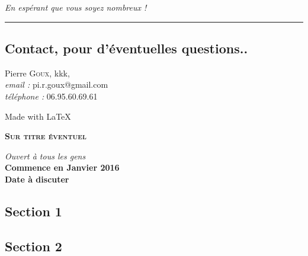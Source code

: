 \documentclass[10pt,a4paper,twocolumn,landscape]{article}
\begin{document}
\begin{CJK}{UTF8}{min}
\textit{En espérant que vous soyez nombreux !}


\rule{7cm}{0.5pt}
\subsection*{Contact, pour d'éventuelles questions..} 
Pierre \textsc{Goux}, kkk, \\
{\em email :} pi.r.goux@gmail.com \\ 
{\em téléphone :} 06.95.60.69.61
\begin{flushright}
\small{Made with \LaTeX}
\end{flushright}
\newpage

\begin{center}
{\bf 
{\huge{\textsc{Sur titre éventuel}
}}}

\vspace*{5em}

\normalsize{}
\def\arete{3}   \def\epaisseur{5}   \def\rayon{2}
\newcommand{\ruban}{(0,0)
++(0:0.57735*\arete-0.57735*\epaisseur+2*\rayon)
++(-30:\epaisseur-1.73205*\rayon)
arc (60:0:\rayon)   -- ++(90:\epaisseur)
arc (0:60:\rayon)   -- ++(150:\arete)
arc (60:120:\rayon) -- ++(210:\epaisseur)
arc (120:60:\rayon) -- cycle}


\end{center}

\begin{center}
\textit{Ouvert à tous les gens}\\
{\bf 
\Large{Commence en Janvier 2016\\\vspace{3pt} Date à discuter\\\vspace{10pt}}
}
\end{center}


\newpage

\begin{framed}
\section{Section 1}
\end{framed}
\newpage
\begin{framed}
\section{Section 2}

\end{framed}
\end{CJK}
\end{document}
